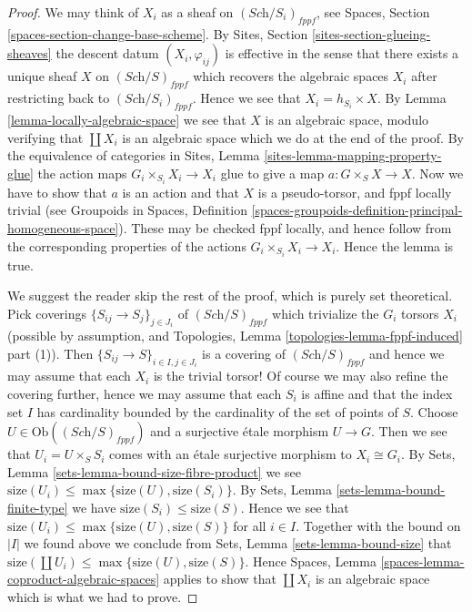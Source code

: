 \begin{proof}
We may think of $X_i$ as a sheaf on $(\textit{Sch}/S_i)_{fppf}$, see
Spaces, Section \ref{spaces-section-change-base-scheme}.
By
Sites, Section \ref{sites-section-glueing-sheaves}
the descent datum $(X_i, \varphi_{ij})$ is effective in the sense that
there exists a unique sheaf $X$ on $(\textit{Sch}/S)_{fppf}$ which
recovers the algebraic spaces $X_i$ after restricting back to
$(\textit{Sch}/S_i)_{fppf}$. Hence we see that
$X_i = h_{S_i} \times X$. By
Lemma \ref{lemma-locally-algebraic-space}
we see that $X$ is an algebraic space, modulo verifying that $\coprod X_i$
is an algebraic space which we do at the end of the proof.
By the equivalence of categories in
Sites, Lemma \ref{sites-lemma-mapping-property-glue}
the action maps $G_i \times_{S_i} X_i \to X_i$
glue to give a map $a : G \times_S X \to X$.
Now we have to show that $a$ is an action and that $X$
is a pseudo-torsor, and fppf locally trivial (see
Groupoids in Spaces,
Definition \ref{spaces-groupoids-definition-principal-homogeneous-space}).
These may be checked fppf locally, and
hence follow from the corresponding properties of the actions
$G_i \times_{S_i} X_i \to X_i$. Hence the lemma is true.

\medskip\noindent
We suggest the reader skip the rest of the proof, which is purely set
theoretical. Pick coverings $\{S_{ij} \to S_j\}_{j \in J_i}$ of
$(\textit{Sch}/S)_{fppf}$
which trivialize the $G_i$ torsors $X_i$ (possible by assumption, and
Topologies, Lemma \ref{topologies-lemma-fppf-induced} part (1)).
Then $\{S_{ij} \to S\}_{i \in I, j \in J_i}$ is a covering of
$(\textit{Sch}/S)_{fppf}$ and hence we may assume that each $X_i$
is the trivial torsor! Of course we may also refine the covering further,
hence we may assume that each $S_i$ is affine and that the index
set $I$ has cardinality bounded by the cardinality of the set of points
of $S$. Choose $U \in \text{Ob}((\textit{Sch}/S)_{fppf})$ and a surjective
\'etale morphism $U \to G$. Then we see that $U_i = U \times_S S_i$ comes
with an \'etale surjective morphism to $X_i \cong G_i$. By
Sets, Lemma \ref{sets-lemma-bound-size-fibre-product}
we see $\text{size}(U_i) \leq \max\{\text{size}(U), \text{size}(S_i)\}$. By
Sets, Lemma \ref{sets-lemma-bound-finite-type}
we have $\text{size}(S_i) \leq \text{size}(S)$.
Hence we see that
$\text{size}(U_i) \leq \max\{\text{size}(U), \text{size}(S)\}$
for all $i \in I$. Together with the bound on $|I|$ we found above we
conclude from
Sets, Lemma \ref{sets-lemma-bound-size}
that $\text{size}(\coprod U_i) \leq \max\{\text{size}(U), \text{size}(S)\}$.
Hence
Spaces, Lemma \ref{spaces-lemma-coproduct-algebraic-spaces}
applies to show that $\coprod X_i$ is an algebraic space which is
what we had to prove.
\end{proof}



















